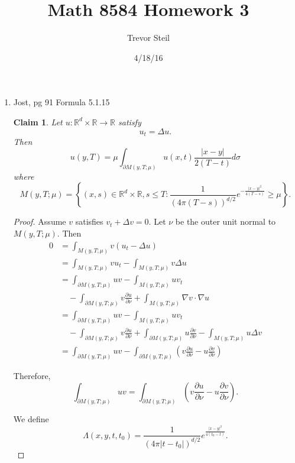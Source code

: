 \documentclass[a4paper]{article}
\title{Math 8584 Homework 3 }
\date{4/18/16}
\author{Trevor Steil}
\newtheorem*{claim}{Claim}
\newcommand{\R}{\mathbb{R}}
\begin{document}
\maketitle
\begin{enumerate}
  \item Jost, pg 91 Formula 5.1.15
    \begin{claim}
      Let $u: \R^d \times \R \to \R$ satisfy
      \begin{equation*}
        u_t = \Delta u.
      \end{equation*}
      Then
      \[ u(y,T) = \mu \int_{\partial M(y, T; \mu)}^{} u(x,t) \frac{|x-y|}{2(T-t)} d \sigma \]
      where
      \[ M(y,T; \mu) = \left\{ (x,s) \in \R^d \times \R, s \leq T : \frac{1}{(4 \pi (T-s))^{d/2}} e^{-\frac{|x-y|^2}{4(T-s)} } \geq \mu \right\} .\]
    \end{claim}

    \begin{proof}
      Assume $v$ satisfies $v_t + \Delta v = 0$. Let $\nu$ be the outer unit normal to $M(y,T;\mu)$. Then
      \begin{align*}
        0 &= \int_{M(y,T;\mu)}^{} v (u_t - \Delta u) \\
        &= \int_{M(y,T;\mu)}^{} v u_t - \int_{M(y,T;\mu)}^{} v \Delta u \\
        &= \int_{\partial M(y,T;\mu)}^{} u v - \int_{M(y,T;\mu)}^{} u v_t \\
        &\quad - \int_{\partial M(y,T;\mu)}^{} v \frac{\partial u}{\partial \nu} + \int_{M(y,T;\mu)}^{} \nabla v \cdot \nabla u \\
        &= \int_{\partial M(y,T;\mu)}^{} u v - \int_{M(y,T;\mu)}^{} u v_t \\
        &\quad - \int_{\partial M(y,T;\mu)}^{} v \frac{\partial u}{\partial \nu} + \int_{\partial M(y,T;\mu)}^{} u \frac{\partial v}{\partial \nu} -
        \int_{M(y,T;\mu)}^{} u \Delta v \\
        &= \int_{\partial M(y,T;\mu)}^{} uv - \int_{\partial M(y,T;\mu)}^{} \left( v \frac{\partial u}{\partial \nu} - u \frac{\partial v}{\partial
        \nu} \right)
      \end{align*}

      Therefore,
      \[ \int_{\partial M(y,T;\mu)}^{} uv = \int_{\partial M(y,T;\mu)}^{} \left( v \frac{\partial u}{\partial \nu} - u \frac{\partial v}{\partial \nu}
      \right) .\]

      We define
      \[ \Lambda(x,y,t,t_0) = \frac{1}{(4 \pi |t-t_0|)^{d/2}} e^{\frac{|x-y|^2}{4(t_0 - t)} } .\]


\end{proof}
\end{enumerate}
\end{document}
